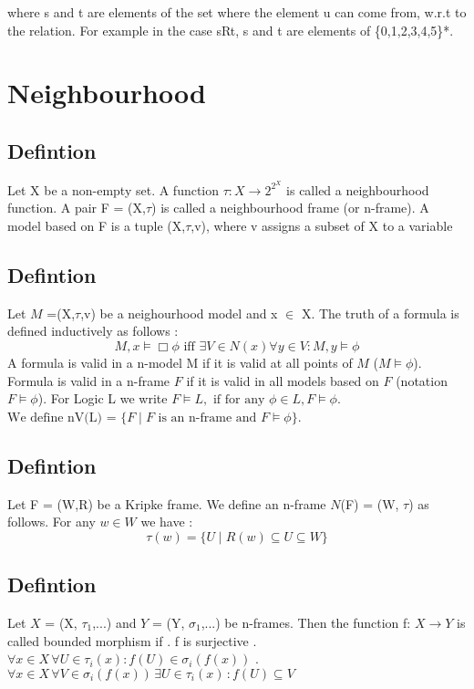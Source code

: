 \documentclass[12pt, a4paper]{scrreprt}
\begin{document}
where s and t are elements of the set where the element u can come from, w.r.t to the relation. For example in the case sRt,
s and t are elements of \{0,1,2,3,4,5\}*.





\chapter{Neighbourhood} 

\section{Defintion} 
Let X be a non-empty set. A function  $\tau : X \rightarrow 2^{2^X}$ is called a neighbourhood function. A pair 
F = (X,$\tau$) is called a neighbourhood frame (or n-frame). A model based on F is a tuple (X,$\tau$,v), where v assigns a subset of X to a variable

\section{Defintion}

Let $M$ =(X,$\tau$,v) be a neighourhood model and x $\in$ X. The truth of a formula is defined inductively as follows :
$$M,x \models \Box \phi \mbox{ iff } \exists V \in N(x) \forall y \in V : M,y \models \phi$$ 
A formula is valid in a n-model M if it is valid at all points of $M$ ($M \models \phi$). Formula is valid in a n-frame $F$ if it is valid in
all models based on $F$ (notation $F \models \phi$). For Logic L we write $ F \models L, \mbox{ if for any }\phi \in L, F \models \phi$. 
$\mbox{We define nV(L) =  } \{ F \mid F \mbox{ is an n-frame and } F \models \phi \}$.

\section{Defintion}
Let F = (W,R) be a Kripke frame. We define an n-frame $N$(F) = (W, $\tau$) as follows.
For any $w\in W$ we have :
$$\tau(w) = \{ U \mid R(w) \subseteq U \subseteq W \}$$

\section{Defintion}
Let $X$ = (X, $\tau_1$,...) and $Y$ = (Y, $\sigma_1$,...) be n-frames. Then the function f:
$X \rightarrow Y$ is called bounded morphism if \newline {}. f is surjective . $\forall x\in X \, \forall U \in \tau_i(x) : f(U) \in \sigma_i (f(x))$ . $\forall x\in X \, \forall V \in \sigma_i (f(x)) \, \exists U \in \tau_i(x) \, : f(U) \subseteq V$
\end{document}
